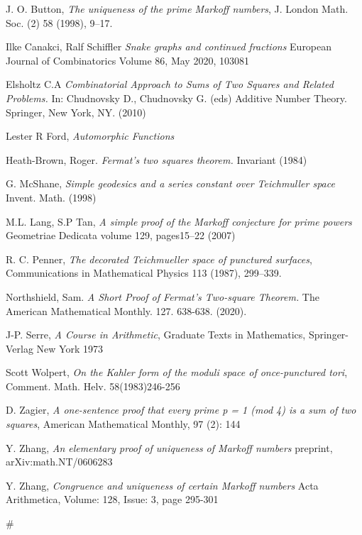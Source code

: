 J. O. Button, 
\textit{The uniqueness of the prime Markoff numbers},
 J. London Math. Soc.
(2) 58 (1998), 9–17.

Ilke Canakci, Ralf Schiffler
\textit{Snake graphs and continued fractions}
European Journal of Combinatorics
Volume 86, May 2020, 103081

Elsholtz C.A 
\textit{Combinatorial Approach to Sums of Two Squares and Related Problems.}
 In: Chudnovsky D., Chudnovsky G. (eds) Additive Number Theory. Springer, New York, NY.
 (2010) 


Lester R Ford,
\textit{Automorphic Functions}

Heath-Brown, Roger. 
\textit{ Fermat’s two squares theorem.} Invariant (1984) 

G. McShane,
\textit{Simple geodesics and a series constant over Teichmuller space}
Invent. Math. (1998)

M.L. Lang, S.P Tan,
\textit{A simple proof of the Markoff conjecture for prime powers}
Geometriae Dedicata volume 129, pages15–22 (2007)

R. C. Penner, 
\textit{The decorated Teichmueller space of punctured surfaces}, 
Communications in Mathematical Physics 113 (1987), 299–339.


Northshield, Sam. 
\textit{A Short Proof of Fermat’s Two-square Theorem.} The American Mathematical Monthly. 127. 638-638. (2020). 

J-P. Serre,
\textit{A Course in Arithmetic},
Graduate Texts in Mathematics,
Springer-Verlag New York
1973

Scott Wolpert,
\textit{On the Kahler form of the moduli space of once-punctured tori}, 
Comment. Math. Helv. 58(1983)246-256

D. Zagier,
 \textit{A one-sentence proof that every prime p = 1 (mod 4) is a sum of two squares}, 
 American Mathematical Monthly, 97 (2): 144
 
 Y. Zhang,
 \textit{ An elementary proof of uniqueness of Markoff numbers}
 preprint, arXiv:math.NT/0606283
 
   Y. Zhang,
 \textit{Congruence and uniqueness of certain Markoff numbers}
 Acta Arithmetica, Volume: 128, Issue: 3, page 295-301



 #
